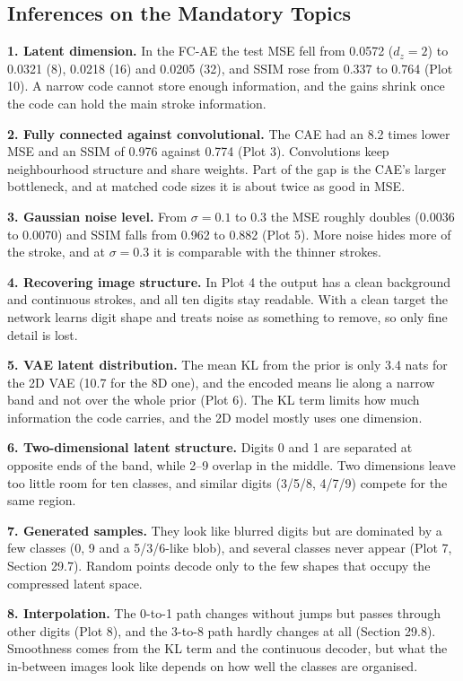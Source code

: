 \documentclass[10pt]{article}
\begin{document}
\subsection*{Inferences on the Mandatory Topics}

\textbf{1. Latent dimension.} In the FC-AE the test MSE fell from 0.0572 ($d_z=2$)
to 0.0321 (8), 0.0218 (16) and 0.0205 (32), and SSIM rose from 0.337 to 0.764
(Plot 10). A narrow code cannot store enough information, and the gains shrink
once the code can hold the main stroke information.

\textbf{2. Fully connected against convolutional.} The CAE had an 8.2 times lower
MSE and an SSIM of 0.976 against 0.774 (Plot 3). Convolutions keep neighbourhood
structure and share weights. Part of the gap is the CAE's larger bottleneck, and
at matched code sizes it is about twice as good in MSE.

\textbf{3. Gaussian noise level.} From $\sigma=0.1$ to 0.3 the MSE roughly doubles
(0.0036 to 0.0070) and SSIM falls from 0.962 to 0.882 (Plot 5). More noise hides
more of the stroke, and at $\sigma=0.3$ it is comparable with the thinner strokes.

\textbf{4. Recovering image structure.} In Plot 4 the output has a clean
background and continuous strokes, and all ten digits stay readable. With a
clean target the network learns digit shape and treats noise as something to
remove, so only fine detail is lost.

\textbf{5. VAE latent distribution.} The mean KL from the prior is only 3.4 nats
for the 2D VAE (10.7 for the 8D one), and the encoded means lie along a narrow
band and not over the whole prior (Plot 6). The KL term limits how much
information the code carries, and the 2D model mostly uses one dimension.

\textbf{6. Two-dimensional latent structure.} Digits 0 and 1 are separated at
opposite ends of the band, while 2--9 overlap in the middle. Two dimensions leave
too little room for ten classes, and similar digits (3/5/8, 4/7/9) compete for
the same region.

\textbf{7. Generated samples.} They look like blurred digits but are dominated by
a few classes (0, 9 and a 5/3/6-like blob), and several classes never appear
(Plot 7, Section 29.7). Random points decode only to the few shapes that occupy
the compressed latent space.

\textbf{8. Interpolation.} The 0-to-1 path changes without jumps but passes through
other digits (Plot 8), and the 3-to-8 path hardly changes at all (Section 29.8).
Smoothness comes from the KL term and the continuous decoder, but what the
in-between images look like depends on how well the classes are organised.
\end{document}
